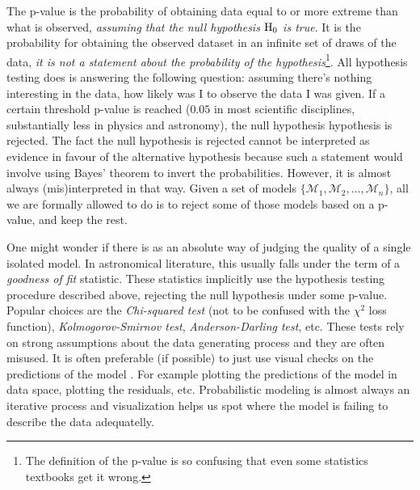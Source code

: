 \documentclass[12pt,dvipsnames]{report}
\begin{document}
The p-value is the probability of obtaining data equal to or more extreme than 
what is observed, \emph{assuming that the null hypothesis $\textrm H_0$ is true}.
It is the probability for obtaining the observed
dataset in an infinite set of draws of the data, \emph{it is not a statement 
about the probability of the hypothesis}\footnote{The definition of the p-value
is so confusing that even some statistics textbooks get it wrong.}.
All hypothesis testing does is answering the following question:
assuming there's nothing interesting in the data, how likely was I to observe 
the data I was given.
If a certain threshold p-value is reached ($0.05$ in most scientific disciplines, 
substantially less in physics and astronomy), the null hypothesis hypothesis 
is rejected.
The fact the null hypothesis is rejected cannot be interpreted as evidence in
favour of the alternative hypothesis because such a statement would involve
using Bayes' theorem to invert the probabilities. However, it is almost always
(mis)interpreted in that way.
Given a set of models $\{\mathcal{M}_1,\mathcal{M}_2,\dots,\mathcal{M}_n\}$, all
we are formally allowed to do is to  reject some of those models based on 
a p-value, and keep the rest.


One might wonder if there is as an absolute way of judging the quality of a
single isolated model. In astronomical literature, this usually falls under the term of
a \textsl{goodness of fit} statistic. These statistics implicitly use the 
hypothesis testing procedure described above, rejecting the null hypothesis 
under some p-value. Popular choices are the \textsl{Chi-squared test} 
(not to be confused with the $\chi^2$ loss function),
\textsl{Kolmogorov-Smirnov test}, \textsl{Anderson-Darling test}, etc.
These tests rely on strong assumptions about the data generating process 
and they are often misused. 
It is often preferable (if possible) to just use visual checks on the predictions 
of the model 
\citep[see][for a visualization guide in the Bayesian paradigm]{arXiv:1709.01449}. 
For example plotting the predictions of the model in data space, plotting 
the residuals, etc.  Probabilistic modeling is almost always an iterative 
process and visualization helps us spot where the model is failing to describe 
the data adequatelly.
\end{document}

